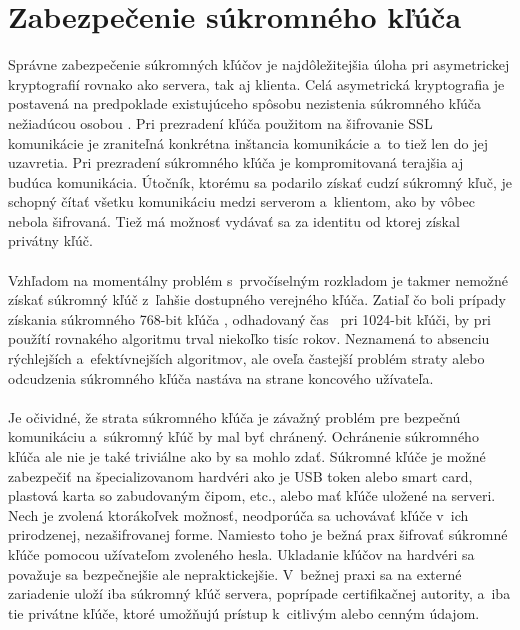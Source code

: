 \documentclass[
  digital, %
  table,   %
oneside,
  nolof,     %
  nolot,     %
]{fithesis3}
\begin{document}
\section{Zabezpečenie súkromného kľúča }
Správne zabezpečenie súkromných kľúčov je najdôležitejšia úloha pri asymetrickej kryptografií rovnako ako servera, tak aj klienta. Celá asymetrická kryptografia je postavená na predpoklade existujúceho spôsobu nezistenia súkromného kľúča nežiadúcou osobou \cite{ssl}. Pri prezradení kľúča použitom na šifrovanie SSL komunikácie je zraniteľná konkrétna inštancia komunikácie a~to tiež len do jej uzavretia. Pri prezradení súkromného kľúča je kompromitovaná terajšia aj budúca komunikácia. Útočník, ktorému sa podarilo získať cudzí súkromný kľuč, je schopný čítať všetku komunikáciu medzi serverom a~klientom, ako by vôbec nebola šifrovaná. Tiež má možnosť vydávať sa za identitu od ktorej získal privátny kľúč.\paragraph{}
Vzhľadom na momentálny problém s~prvočíselným rozkladom je takmer nemožné získať súkromný kľúč z~ľahšie dostupného verejného kľúča. Zatiaľ čo boli prípady získania súkromného 768-bit kľúča \cite{crypt768}, odhadovaný čas~ pri 1024-bit kľúči, by pri  použítí rovnakého algoritmu trval niekoľko tisíc rokov. Neznamená to absenciu rýchlejších a~efektívnejších algoritmov, ale oveľa častejší problém straty alebo odcudzenia súkromného kľúča nastáva na strane koncového užívateľa.\paragraph{}
Je očividné, že strata súkromného kľúča je závažný problém pre bezpečnú komunikáciu a~súkromný kľúč by mal byť chránený. Ochránenie súkromného kľúča ale nie je také triviálne ako by sa mohlo zdať. Súkromné kľúče je možné zabezpečiť na špecializovanom hardvéri ako je USB token alebo smart card, plastová karta so zabudovaným čipom, etc., alebo mať kľúče uložené na serveri. Nech je zvolená ktorákoľvek možnosť, neodporúča sa  uchovávať kľúče v~ich prirodzenej, nezašifrovanej forme. Namiesto toho je bežná prax šifrovať súkromné kľúče pomocou užívateľom zvoleného hesla. Ukladanie kľúčov na hardvéri sa považuje sa bezpečnejšie ale nepraktickejšie. V~bežnej praxi sa na externé zariadenie uloží iba súkromný kľúč servera, poprípade certifikačnej autority, a~iba tie privátne kľúče, ktoré umožňujú prístup k~citlivým alebo cenným údajom. \paragraph{}
\end{document}
